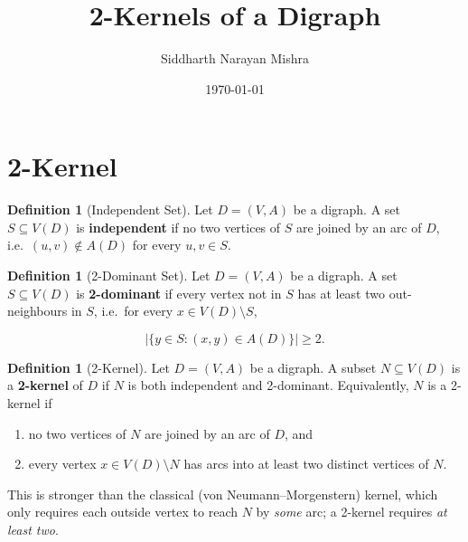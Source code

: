 \documentclass[11pt]{article}
\title{2-Kernels of a Digraph}
\author{Siddharth Narayan Mishra}
\date{\today}
\theoremstyle{plain}
\theoremstyle{definition}
\newtheorem{definition}[theorem]{Definition}
\theoremstyle{remark}
\begin{document}
\maketitle

\section{2-Kernel}

\begin{definition}[Independent Set]
  Let $D=(V,A)$ be a digraph. A set $S\subseteq V(D)$ is \textbf{independent} if no two vertices of $S$ are joined by an arc of $D$, i.e.\ $(u,v)\notin A(D)$ for every $u,v\in S$.
\end{definition}

\begin{definition}[2-Dominant Set]
  Let $D=(V,A)$ be a digraph. A set $S\subseteq V(D)$ is \textbf{2-dominant} if every vertex not in $S$ has at least two out-neighbours in $S$, i.e.\ for every $x\in V(D)\setminus S$,

  \[
    \left|\{y\in S: (x,y)\in A(D)\}\right|\ge 2.
  \]
\end{definition}

\begin{definition}[2-Kernel]
  Let $D=(V,A)$ be a digraph. A subset $N\subseteq V(D)$ is a \textbf{2-kernel} of $D$ if $N$ is both independent and 2-dominant. Equivalently, $N$ is a 2-kernel if

  \begin{enumerate}
    \item no two vertices of $N$ are joined by an arc of $D$, and
    \item every vertex $x\in V(D)\setminus N$ has arcs into at least two distinct vertices of $N$.
  \end{enumerate}

  This is stronger than the classical (von Neumann--Morgenstern) kernel, which only requires each outside vertex to reach $N$ by \emph{some} arc; a 2-kernel requires \emph{at least two}.
\end{definition}

\bigskip
\end{document}
